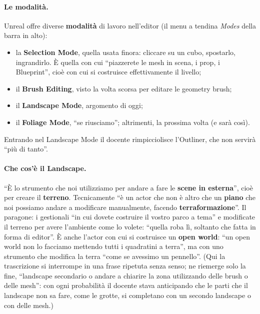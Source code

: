 \paragraph{Le modalità.} Unreal offre diverse \textbf{modalità} di lavoro nell'editor
(il menu a tendina \emph{Modes} della barra in alto):
\begin{itemize}
  \item la \textbf{Selection Mode}, quella usata finora: cliccare su un cubo, spostarlo,
        ingrandirlo. È quella con cui ``piazzerete le mesh in scena, i prop, i
        Blueprint'', cioè con cui si costruisce effettivamente il livello;
  \item il \textbf{Brush Editing}, visto la volta scorsa per editare le geometry brush;
  \item il \textbf{Landscape Mode}, argomento di oggi;
  \item il \textbf{Foliage Mode}, ``se riusciamo''; altrimenti, la prossima volta (e sarà
        così).
\end{itemize}
Entrando nel Landscape Mode il docente rimpicciolisce l'Outliner, che non servirà
``più di tanto''.

\paragraph{Che cos'è il Landscape.} ``È lo strumento che noi utilizziamo per andare a fare le
\textbf{scene in esterna}'', cioè per creare il \textbf{terreno}. Tecnicamente ``è un actor
che non è altro che un \textbf{piano} che noi possiamo andare a modificare manualmente,
facendo \textbf{terraformazione}''. Il paragone: i gestionali ``in cui dovete costruire il
vostro parco a tema'' e modificate il terreno per avere l'ambiente come lo volete:
``quella roba lì, soltanto che fatta in forma di editor''. È anche l'actor con cui si
costruisce un \textbf{open world}: ``un open world non lo facciamo mettendo tutti i
quadratini a terra'', ma con uno strumento che modifica la terra ``come se avessimo un
pennello''. (Qui la trascrizione si interrompe in una frase ripetuta senza senso; ne
riemerge solo la fine, ``landscape secondario o andare a chiarire la zona utilizzando delle
brush o delle mesh'': con ogni probabilità il docente stava anticipando che le parti che il
landscape non sa fare, come le grotte, si completano con un secondo landscape o con delle
mesh.)

